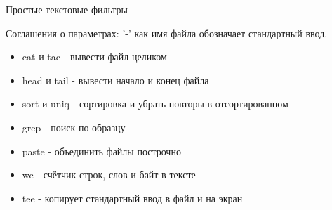 \begin{frame}{Простые текстовые фильтры}

  Соглашения о параметрах: \alert{'-'} как имя файла обозначает стандартный ввод.

  \begin{itemize}
    \item \alert{cat} и \alert{tac} - вывести файл целиком \pause
    \item \alert{head} и \alert{tail} - вывести начало и конец файла \pause
    \item \alert{sort} и \alert{uniq} - сортировка и убрать повторы в отсортированном \pause
    \item \alert{grep} - поиск по образцу \pause
    \item \alert{paste} - объединить файлы построчно \pause
    \item \alert{wc} - счётчик строк, слов и байт в тексте \pause
    \item \alert{tee} - копирует стандартный ввод в файл и на экран 

  \end{itemize}
\end{frame}

